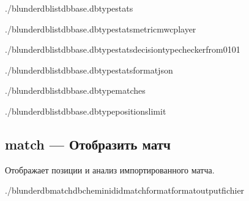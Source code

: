 \documentclass[letterpaper,10pt,russian]{sphinxmanual}
\begin{document}
\begin{sphinxVerbatim}[commandchars=\\\{\}]
./blunderdblist\PYGZhy{}\PYGZhy{}dbbase.db\PYGZhy{}\PYGZhy{}typestats

./blunderdblist\PYGZhy{}\PYGZhy{}dbbase.db\PYGZhy{}\PYGZhy{}typestats\PYGZhy{}\PYGZhy{}metricmwc\PYGZhy{}\PYGZhy{}player

./blunderdblist\PYGZhy{}\PYGZhy{}dbbase.db\PYGZhy{}\PYGZhy{}typestats\PYGZhy{}\PYGZhy{}decision\PYGZhy{}typechecker\PYGZhy{}\PYGZhy{}from\PYGZhy{}01\PYGZhy{}01

./blunderdblist\PYGZhy{}\PYGZhy{}dbbase.db\PYGZhy{}\PYGZhy{}typestats\PYGZhy{}\PYGZhy{}formatjson

./blunderdblist\PYGZhy{}\PYGZhy{}dbbase.db\PYGZhy{}\PYGZhy{}typematches

./blunderdblist\PYGZhy{}\PYGZhy{}dbbase.db\PYGZhy{}\PYGZhy{}typepositions\PYGZhy{}\PYGZhy{}limit
\end{sphinxVerbatim}


\subsection{match — Отобразить матч}
\label{\detokenize{cli:match-afficher-un-match}}
\sphinxAtStartPar
Отображает позиции и анализ импортированного матча.

\begin{sphinxVerbatim}[commandchars=\\\{\}]
./blunderdbmatch\PYGZhy{}\PYGZhy{}db\PYGZlt{}chemin\PYGZgt{}\PYGZhy{}\PYGZhy{}id\PYGZlt{}id\PYGZus{}match\PYGZgt{}\PYG{o}{[}\PYGZhy{}\PYGZhy{}format\PYGZlt{}format\PYGZgt{}\PYG{o}{]}\PYG{o}{[}\PYGZhy{}\PYGZhy{}output\PYGZlt{}fichier\PYGZgt{}\PYG{o}{]}
\end{sphinxVerbatim}
\end{document}
